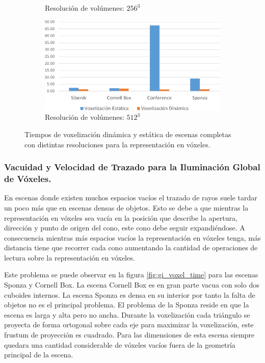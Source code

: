 \begin{figure}[H]
\begin{subfigure}{.49\textwidth}
		\caption*{Resolución de volúmenes: $256^3$}
	\end{subfigure}
	\begin{subfigure}{.49\textwidth}
		\centering
		\includegraphics[width=\linewidth]{media/voxelzation_512_cropped.pdf}	
		\caption*{Resolución de volúmenes: $512^3$}
	\end{subfigure}
	\caption{Tiempos de voxelización dinámica y estática de escenas completas con distintas resoluciones para la representación en vóxeles.}
	\label{fig:voxelization_times}
\end{figure}

\subsubsection{Vacuidad y Velocidad de Trazado para la Iluminación Global de Vóxeles.}
\label{subsubsec:emptyness}

En escenas donde existen muchos espacios vacíos el trazado de rayos suele tardar un poco más que en escenas densas de objetos. Esto se debe a que mientras la representación en vóxeles sea vacía en la posición que describe la apertura, dirección y punto de origen del cono, este cono debe seguir expandiéndose. A consecuencia mientras más espacios vacíos la representación en vóxeles tenga, más distancia tiene que recorrer cada cono aumentando la cantidad de operaciones de lectura sobre la representación en vóxeles.

Este problema se puede observar en la figura \ref{fig:gi_voxel_time} para las escenas Sponza y Cornell Box. La escena Cornell Box es en gran parte vacua con solo dos cuboides internos. La escena Sponza es densa en su interior por tanto la falta de objetos no es el principal problema. El problema de la Sponza reside en que la escena es larga y alta pero no ancha. Durante la voxelización cada triángulo se proyecta de forma ortogonal sobre cada eje para maximizar la voxelización, este frustum de proyección es cuadrado. Para las dimensiones de esta escena siempre quedara una cantidad considerable de vóxeles vacíos fuera de la geometría principal de la escena. 

